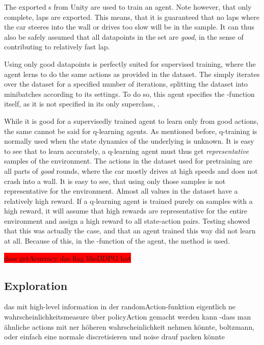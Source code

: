The exported s from Unity are used to train an agent. Note however, that only complete,  laps are exported. This means, that it is guaranteed that no laps where the car steeres into the wall or drives too slow will be in the sample. It can thus also be safely assumed that all datapoints in the set are \textit{good}, in the sense of contributing to relatively fast lap. 

Using only good datapoints is perfectly suited for supervised training, where the agent lerns to do the same actions as provided in the dataset. The  simply iterates over the dataset for a specified number of iterations, splitting the dataset into minibatches according to its settings. To do so, this agent specifies the -function itself, as it is not specified in its only superclass, .

While it is good for a supervisedly trained agent to learn only from good actions, the same cannot be said for q-learning agents. As mentioned before, q-training is normally used when the state dynamics of the underlying is unknown. It is easy to see that to learn accurately, a q-learning agent must thus get \textit{representative} samples of the environment. The actions in the dataset used for pretraining are all parts of \textit{good} rounds, where the car mostly drives at high speeds and does not crash into a wall. It is easy to see, that using only those samples is not representative for the environment. Almost all values in the dataset have a relatively high reward. If a q-learning agent is trained purely on samples with a high reward, it will assume that high rewards are representative for the entire environment and assign a high reward to all state-action pairs. Testing showed that this was actually the case, and that an agent trained this way did not learn at all. Because of this, in the -function of the agent, the method  is used. 



\colorbox{red}{dass getAcurracy das flag likeDDPG hat}


\subsection{Exploration}

das mit high-level information in der randomAction-funktion eigentlich ne wahrscheinlichkeitsmeasure über policyAction gemacht werden kann
-dass man ähnliche actions mit ner höheren wahrscheinlichkeit nehmen könnte, boltzmann, oder einfach eine normale discretisieren und noise drauf packen könnte

